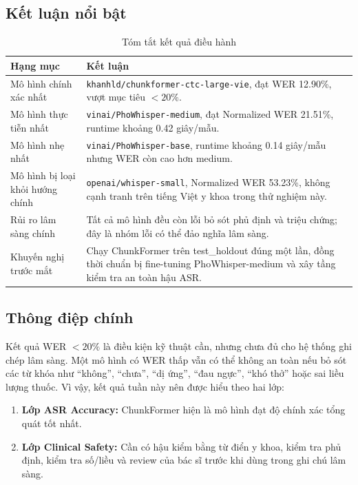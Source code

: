 \documentclass[12pt,a4paper]{article}
\begin{document}
\subsection{Kết luận nổi bật}

\begin{table}[h]
\centering
\caption{Tóm tắt kết quả điều hành}
\begin{tabularx}{\textwidth}{|l|X|}
\hline
\textbf{Hạng mục} & \textbf{Kết luận} \\
\hline
Mô hình chính xác nhất & \texttt{khanhld/chunkformer-ctc-large-vie}, đạt WER 12.90\%, vượt mục tiêu $<20\%$. \\
\hline
Mô hình thực tiễn nhất & \texttt{vinai/PhoWhisper-medium}, đạt Normalized WER 21.51\%, runtime khoảng 0.42 giây/mẫu. \\
\hline
Mô hình nhẹ nhất & \texttt{vinai/PhoWhisper-base}, runtime khoảng 0.14 giây/mẫu nhưng WER còn cao hơn medium. \\
\hline
Mô hình bị loại khỏi hướng chính & \texttt{openai/whisper-small}, Normalized WER 53.23\%, không cạnh tranh trên tiếng Việt y khoa trong thử nghiệm này. \\
\hline
Rủi ro lâm sàng chính & Tất cả mô hình đều còn lỗi bỏ sót phủ định và triệu chứng; đây là nhóm lỗi có thể đảo nghĩa lâm sàng. \\
\hline
Khuyến nghị trước mắt & Chạy ChunkFormer trên test\_holdout đúng một lần, đồng thời chuẩn bị fine-tuning PhoWhisper-medium và xây tầng kiểm tra an toàn hậu ASR. \\
\hline
\end{tabularx}
\end{table}

\subsection{Thông điệp chính}

Kết quả WER $<20\%$ là điều kiện kỹ thuật cần, nhưng chưa đủ cho hệ thống ghi chép lâm sàng. Một mô hình có WER thấp vẫn có thể không an toàn nếu bỏ sót các từ khóa như ``không'', ``chưa'', ``dị ứng'', ``đau ngực'', ``khó thở'' hoặc sai liều lượng thuốc. Vì vậy, kết quả tuần này nên được hiểu theo hai lớp:
\begin{enumerate}[leftmargin=1.2cm]
    \item \textbf{Lớp ASR Accuracy:} ChunkFormer hiện là mô hình đạt độ chính xác tổng quát tốt nhất.
    \item \textbf{Lớp Clinical Safety:} Cần có hậu kiểm bằng từ điển y khoa, kiểm tra phủ định, kiểm tra số/liều và review của bác sĩ trước khi dùng trong ghi chú lâm sàng.
\end{enumerate}
\end{document}
